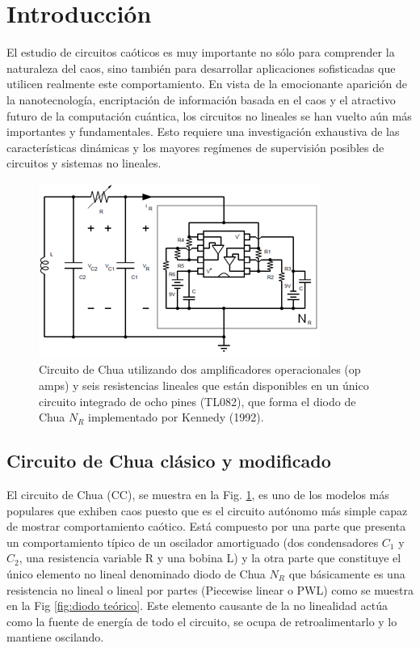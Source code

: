 \documentclass{rbf}
\begin{document}
\section{Introducción}
El estudio de circuitos caóticos es muy importante no sólo para comprender la naturaleza del caos, sino también para desarrollar aplicaciones sofisticadas que utilicen realmente este comportamiento. En vista de la emocionante aparición de la nanotecnología, encriptación de información basada en el caos y el atractivo futuro de la computación cuántica, los circuitos no lineales se han vuelto aún más importantes y fundamentales. Esto requiere una investigación exhaustiva de las características dinámicas y los mayores regímenes de supervisión posibles de circuitos y sistemas no lineales. 

\begin{figure}
    \includegraphics{circuito de Chua.png}
    \caption{\label{fig:circuito de Chua}Circuito de Chua utilizando dos amplificadores operacionales (op amps) y seis resistencias lineales que están disponibles en un único circuito integrado de ocho pines (TL082), que forma el diodo de Chua $N_{R}$ implementado por Kennedy (1992).}
\end{figure}

\subsection{Circuito de Chua clásico y modificado}
El circuito de Chua (CC), se muestra en la 
Fig. \ref{fig:circuito de Chua}, es uno de los modelos más populares que exhiben caos puesto que es el circuito autónomo más simple capaz de mostrar comportamiento caótico. Está compuesto por una parte que presenta un comportamiento típico de un oscilador amortiguado (dos condensadores $C_1$ y $C_2$, una resistencia variable R y una bobina L) y la otra parte que constituye el único elemento no lineal denominado diodo de Chua $N_R$ que básicamente es una resistencia no lineal o lineal por partes (Piecewise linear o PWL) como se muestra en la Fig \ref{fig:diodo teórico}. Este elemento causante de la no linealidad actúa como la fuente de energía de todo  el circuito, se ocupa de retroalimentarlo y lo mantiene oscilando.
\end{document}
